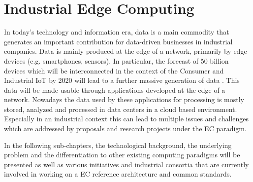 \section{Industrial Edge Computing}\label{sec:background}
In today's technology and information era, data is a main commodity that generates an important contribution for data-driven businesses in industrial companies. Data is mainly produced at the edge of a network, primarily by edge devices (e.g. smartphones, sensors). In particular, the forecast of 50 billion devices which will be interconnected in the context of the Consumer and Industrial IoT by 2020 will lead to a further massive generation of data \cite{7488250}. This data will be made usable through applications developed at the edge of a network. Nowadays the data used by these applications for processing is mostly stored, analyzed and processed in data centers in a cloud based environment. Especially in an industrial context this can lead to multiple issues and challenges which are addressed by proposals and research projects under the EC paradigm.\par
In the following sub-chapters, the technological background, the underlying problem and the differentiation to other existing computing paradigms will be presented as well as various initiatives and industrial consortia that are currently involved in working on a EC reference architecture and common standards.

